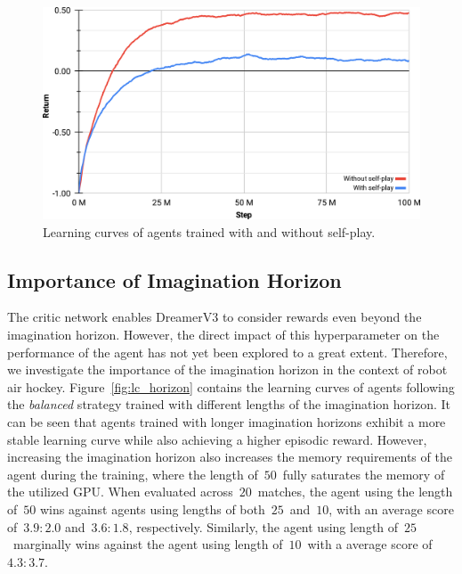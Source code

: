 \documentclass{article}
\begin{document}
\begin{figure}[ht]
    \centering
    \includegraphics[width=0.9\linewidth]{graphics/learning_curve_selfplay.png}
    \caption{Learning curves of agents trained with and without self-play.}
    \label{fig:lc_selfplay}
\end{figure}

\subsection{Importance of Imagination Horizon}\label{ssec:importance-of-imagination-horizon}

The critic network enables DreamerV3 to consider rewards even beyond the imagination horizon. However, the direct impact of this hyperparameter on the performance of the agent has not yet been explored to a great extent. Therefore, we investigate the importance of the imagination horizon in the context of robot air hockey. Figure~\ref{fig:lc_horizon} contains the learning curves of agents following the \textit{balanced} strategy trained with different lengths of the imagination horizon. It can be seen that agents trained with longer imagination horizons exhibit a more stable learning curve while also achieving a higher episodic reward. However, increasing the imagination horizon also increases the memory requirements of the agent during the training, where the length of~\(50\)~fully saturates the memory of the utilized GPU. When evaluated across~\(20\)~matches, the agent using the length of~\(50\) wins against agents using lengths of both~\(25\)~and~\(10\), with an average score of~\(3.9 : 2.0\) and~\(3.6 : 1.8\), respectively. Similarly, the agent using length of~\(25\)~marginally wins against the agent using length of~\(10\)~with a average score of~\(4.3 : 3.7\).
\end{document}
